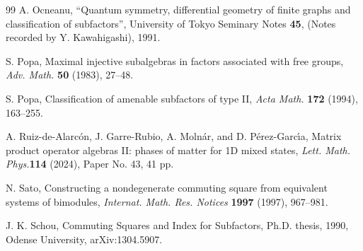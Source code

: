 \documentclass[12pt]{article}
\begin{document}
\begin{thebibliography}{99}
A. Ocneanu,
``Quantum symmetry, differential geometry of finite graphs and
classification of subfactors'', University of Tokyo Seminary Notes 
{\bf 45}, (Notes recorded by Y. Kawahigashi), 1991.

S. Popa,
Maximal injective subalgebras in factors associated with free groups,
\textit{Adv. Math.} {\bf 50} (1983), 27--48.

S. Popa, Classification of amenable subfactors of type II,
\textit{Acta Math.} {\bf 172} (1994), 163--255.

A. Ruiz-de-Alarc\'on, J. Garre-Rubio, A. Moln\'ar, 
and D. P\'erez-Garc\'\i a, 
Matrix product operator algebras II: 
phases of matter for 1D mixed states,
\textit{Lett. Math. Phys.}{\bf 114} (2024), Paper No. 43, 41 pp.

N. Sato, 
Constructing a nondegenerate commuting square from 
equivalent systems of bimodules,
\textit{Internat. Math. Res. Notices} {\bf 1997} (1997), 967--981.

J. K. Schou,
Commuting Squares and Index for Subfactors,
Ph.D. thesis, 1990, Odense University,
arXiv:1304.5907.

\end{thebibliography}
\end{document}
